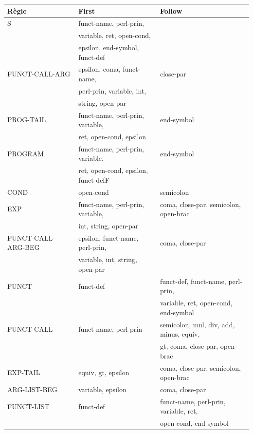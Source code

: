 \documentclass[a4paper,10pt]{article}
\begin{document}
\hspace{-1.0cm}\begin{tabular}{|l|l|l|}	
\hline
Règle				&		First							&	Follow								\\ \hline
S 					& funct-name, perl-prin, 				& 										\\
					& variable, ret, open-cond, 			& 										\\
					& epsilon, end-symbol, funct-def		& 										\\ \hline
FUNCT-CALL-ARG		& epsilon, coma, funct-name,			& close-par								 \\
					& perl-prin, variable, int, 			& 										\\
					& string, open-par						& 									\\ \hline
PROG-TAIL			& funct-name, perl-prin, variable, 		& end-symbol \\
					& ret, open-cond, epsilon				&					\\ \hline
PROGRAM 			& funct-name, perl-prin, variable, 		& end-symbol \\
					& ret, open-cond, epsilon, funct-defF	& 					\\ \hline
COND 				& open-cond 							& semicolon		\\ \hline
EXP 				& funct-name, perl-prin, variable,		& coma, close-par, semicolon, open-brac 	\\
					& int, string, open-par					&											\\ \hline
FUNCT-CALL-ARG-BEG 	& epsilon, funct-name, perl-prin, 		& coma, close-par	\\ 
					& variable, int, string, open-par		&						\\ \hline
FUNCT 				& funct-def 							& funct-def, funct-name, perl-prin, \\
					&										& variable, ret, open-cond, end-symbol \\ \hline
FUNCT-CALL 			& funct-name, perl-prin					& semicolon, mul, div, add, minus, equiv, \\
					&										& gt, coma, close-par, open-brac			\\ \hline	
EXP-TAIL 			& equiv, gt, epsilon 					& coma, close-par, semicolon, open-brac \\ \hline
ARG-LIST-BEG 		& variable, epsilon 					& coma, close-par								\\ \hline
FUNCT-LIST 			& funct-def 							& funct-name, perl-prin, variable, ret,  \\
					&										& open-cond, end-symbol					\\ \hline

\end{tabular}
\end{document}
